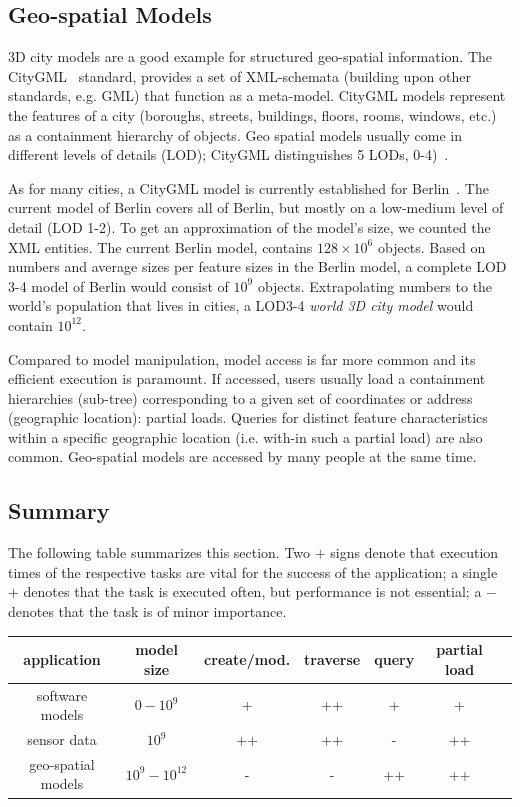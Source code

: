 \subsection{Geo-spatial Models}

3D city models are a good example for structured geo-spatial information. The CityGML~\cite{cityGML} standard, provides a set of XML-schemata (building upon other standards, e.g. GML) that function as a meta-model. CityGML models represent the features of a city (boroughs, streets, buildings, floors, rooms, windows, etc.) as a containment hierarchy of objects. Geo spatial models usually come in different levels of details (LOD); CityGML distinguishes 5 LODs, 0-4)~\cite{cityGML}. 

As for many cities, a CityGML model is currently established for Berlin~\cite{berlinGML}. The current model of Berlin covers all of Berlin, but mostly on a low-medium level of detail (LOD 1-2). To get an approximation of the model's size, we counted the XML entities. The current Berlin model, contains $128\times 10^6$ objects. Based on numbers and average sizes per feature sizes in the Berlin model, a complete LOD 3-4 model of Berlin would consist of $10^9$ objects. Extrapolating numbers to the world's population that lives in cities, a LOD3-4 \emph{world 3D city model} would contain $10^{12}$.

Compared to model manipulation, model access is far more common and its efficient execution is paramount. If accessed, users usually load a containment hierarchies (sub-tree) corresponding to a given set of coordinates or address (geographic location): partial loads. Queries for distinct feature characteristics within a specific geographic location (i.e. with-in such a partial load) are also common. Geo-spatial models are accessed by many people at the same time. 

\subsection*{Summary}

The following table summarizes this section. Two $+$ signs denote that execution times of the respective tasks are vital for the success of the application; a single $+$ denotes that the task is executed often, but performance is not essential; a $-$ denotes that the task is of minor importance.

\begin{center}
\begin{tabular}{|c||c|c|c|c|c|c|}
\hline
\bf{application} & \bf{model size} & \bf{create/mod.} & \bf{traverse} & \bf{query} & \bf{partial load} \\
\hline\hline
software models & $0-10^9$ & + & ++ & + & + \\
\hline
sensor data & $10^9$ & ++ & ++ & - & ++ \\
\hline
geo-spatial models & $10^9-10^{12}$ & - & - & ++ & ++ \\
\hline
\end{tabular}
\end{center}